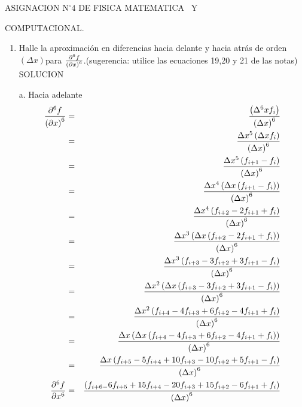 \documentclass{article}
\begin{document}
\begin{center}
ASIGNACION N$%
{{}^\circ}%
4$ DE FISICA MATEMATICA \ Y

COMPUTACIONAL.
\end{center}

\begin{enumerate}
\item  Halle la aproximaci\'{o}n en diferencias hacia delante y hacia
atr\'{a}s de orden $\left( \Delta x\right) $para $\frac{\partial ^{6}f}{%
\left( \partial x\right) ^{6}}$.(sugerencia: utilice las ecuaciones 19,20 y
21 de las notas)\newline
SOLUCION

\item[a.]  Hacia adelante\newline
\begin{eqnarray*}
\frac{\partial ^{6}f}{\left( \partial x\right) ^{6}} &=&\frac{\left( \Delta
^{6}xf_{i}\right) }{\left( \Delta x\right) ^{6}} \\
&=&\frac{\Delta x^{5}\left( \Delta xf_{i}\right) }{\left( \Delta x\right)
^{6}} \\
&=&\frac{\Delta x^{5}\left( f_{i+1}-f_{i}\right) }{\left( \Delta x\right)
^{6}} \\
&=&\frac{\Delta x^{4}\left( \Delta x\left( f_{i+1}-f_{i}\right) \right) }{%
\left( \Delta x\right) ^{6}} \\
&=&\frac{\Delta x^{4}\left( f_{i+2}-2f_{i+1}+f_{i}\right) }{\left( \Delta
x\right) ^{6}} \\
&=&\frac{\Delta x^{3}\left( \Delta x\left( f_{i+2}-2f_{i+1}+f_{i}\right)
\right) }{\left( \Delta x\right) ^{6}} \\
&=&\frac{\Delta x^{3}\left( f_{i+3}-3f_{i+2}+3f_{i+1}-f_{i}\right) }{\left(
\Delta x\right) ^{6}} \\
&=&\frac{\Delta x^{2}\left( \Delta x\left(
f_{i+3}-3f_{i+2}+3f_{i+1}-f_{i}\right) \right) }{\left( \Delta x\right) ^{6}}
\\
&=&\frac{\Delta x^{2}\left( f_{i+4}-4f_{i+3}+6f_{i+2}-4f_{i+1}+f_{i}\right) 
}{\left( \Delta x\right) ^{6}} \\
&=&\frac{\Delta x\left( \Delta x\left(
f_{i+4}-4f_{i+3}+6f_{i+2}-4f_{i+1}+f_{i}\right) \right) }{\left( \Delta
x\right) ^{6}} \\
&=&\frac{\Delta x\left(
f_{i+5}-5f_{i+4}+10f_{i+3}-10f_{i+2}+5f_{i+1}-f_{i}\right) }{\left( \Delta
x\right) ^{6}} \\
\frac{\partial ^{6}f}{\partial x^{6}} &=&\frac{\left(
f_{i+6-}6f_{i+5}+15f_{i+4}-20f_{i+3}+15f_{i+2}-6f_{i+1}+f_{i}\right) }{%
\left( \Delta x\right) ^{6}}
\end{eqnarray*}
\end{enumerate}
\end{document}

